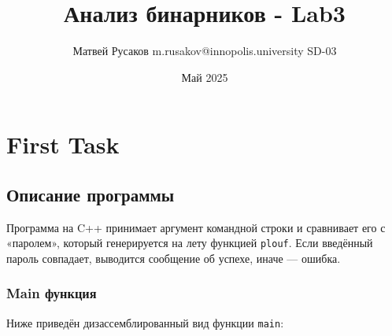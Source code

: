 \usepackage{hyperref}
\usepackage[utf8]{inputenc}
\usepackage[T2A]{fontenc}
\usepackage[top=5cm,bottom=3cm,right=3cm,left=3cm]{geometry}
\usepackage{graphicx}

\title{Анализ бинарников - Lab3}
\author{Матвей Русаков m.rusakov@innopolis.university SD-03}
\date{Май 2025}



    \maketitle
    \section{First Task}

    \subsection{Описание программы}

    Программа на C++ принимает аргумент командной строки и сравнивает его с «паролем»,
    который генерируется на лету функцией \texttt{plouf}.
    Если введённый пароль совпадает, выводится сообщение об успехе, иначе — ошибка.

    \subsubsection{Main функция}\label{subsec:main-}

    Ниже приведён дизассемблированный вид функции \texttt{main}:

